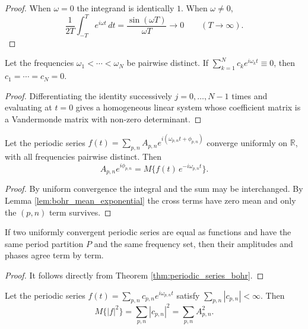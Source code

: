 \begin{proof}
When $\omega = 0$ the integrand is identically $1$. When $\omega \neq 0$,
\[
\frac{1}{2T}\int_{-T}^{T} e^{i\omega t}\,dt = \frac{\sin(\omega T)}{\omega T} \to 0 \qquad (T \to \infty).
\]
\end{proof}

\begin{proposition}\label{prop:vandermonde_uniqueness}
Let the frequencies $\omega_1 < \cdots < \omega_N$ be pairwise distinct. If $\sum_{k=1}^{N} c_k e^{i\omega_k t} \equiv 0$, then $c_1 = \cdots = c_N = 0$.
\end{proposition}

\begin{proof}
Differentiating the identity successively $j = 0, \dots, N-1$ times and evaluating at $t = 0$ gives a homogeneous linear system whose coefficient matrix is a Vandermonde matrix with non-zero determinant.
\end{proof}

\begin{theorem}\label{thm:periodic_series_bohr}
Let the periodic series $f(t) = \sum_{p,n} A_{p,n} e^{i(\omega_{p,n} t + \phi_{p,n})}$ converge uniformly on $\mathbb{R}$, with all frequencies pairwise distinct. Then
\[
A_{p,n} e^{i\phi_{p,n}} = M\big\{ f(t)\, e^{-i\omega_{p,n} t} \big\}.
\]
\end{theorem}

\begin{proof}
By uniform convergence the integral and the sum may be interchanged. By Lemma \ref{lem:bohr_mean_exponential} the cross terms have zero mean and only the $(p,n)$ term survives.
\end{proof}

\begin{corollary}\label{cor:periodic_series_unique}
If two uniformly convergent periodic series are equal as functions and have the same period partition $P$ and the same frequency set, then their amplitudes and phases agree term by term.
\end{corollary}

\begin{proof}
It follows directly from Theorem \ref{thm:periodic_series_bohr}.
\end{proof}

\begin{theorem}\label{thm:bohr_parseval}
Let the periodic series $f(t) = \sum_{p,n} c_{p,n} e^{i\omega_{p,n} t}$ satisfy $\sum_{p,n} |c_{p,n}| < \infty$. Then
\[
M\{|f|^2\} = \sum_{p,n} |c_{p,n}|^2 = \sum_{p,n} A_{p,n}^2.
\]
\end{theorem}

